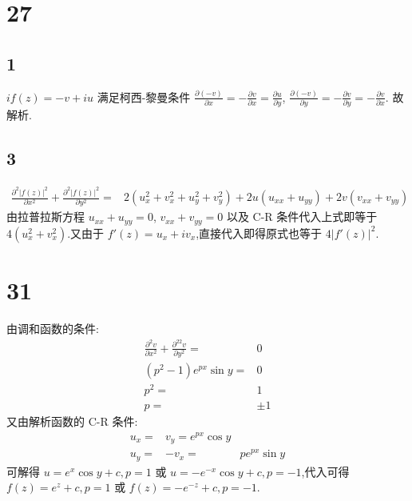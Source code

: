     \section{27}
        \subsection{1} $if(z)=-v+iu$ 满足柯西-黎曼条件 $\frac{\partial (-v)}{\partial x}=-\frac{\partial v}{\partial x}=\frac{\partial u}{\partial y}$, $\frac{\partial (-v)}{\partial y}=-\frac{\partial v}{\partial y}=-\frac{\partial v}{\partial x}$. 故解析.
        \subsection{3}
        \begin{align}
            \frac{\partial^2 |f(z)|^2}{\partial x^2}+\frac{\partial ^2|f(z)|^2}{\partial y^2}=&2(u_{x}^2+v_{x}^2+u_{y}^2+v_{y}^2)+2u(u_{x x}+u_{y y})+2v(v_{x x}+v_{y y})\nonumber
        \end{align}
        由拉普拉斯方程 $u_{x x}+u_{y y}=0$, $v_{x x}+v _{y y}=0$ 以及 C-R 条件代入上式即等于 $4(u_{x}^2+v _{x}^2)$.又由于 $f'(z)=u_{x}+iv_{x}$,直接代入即得原式也等于 $4|f'(z)|^2$.
    \section{31} 由调和函数的条件:
    \begin{align}
        \frac{\partial^2 v}{\partial x^2}+\frac{\partial ^22 v}{\partial y^2}=&0\nonumber\\
        (p^2-1)e^{px}\sin y=&0\nonumber\\
        p^2=&1\nonumber\\
        p=&\pm 1\nonumber
    \end{align}
    又由解析函数的 C-R 条件:
    \begin{align}
        u_{x}=&v_{y}=e^{px}\cos y\nonumber\\
        u_{y}=&-v _{x}=&pe^{px}\sin y\nonumber
    \end{align}
    可解得 $u=e^{x}\cos y+c,p=1$ 或 $u=-e^{-x}\cos y+c,p=-1$,代入可得 $f(z)=e^{z}+c,p=1$ 或 $f(z)=-e^{-z}+c,p=-1$.

